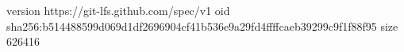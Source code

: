 version https://git-lfs.github.com/spec/v1
oid sha256:b514488599d069d1df2696904cf41b536e9a29fd4ffffcaeb39299c9f1f88f95
size 626416
